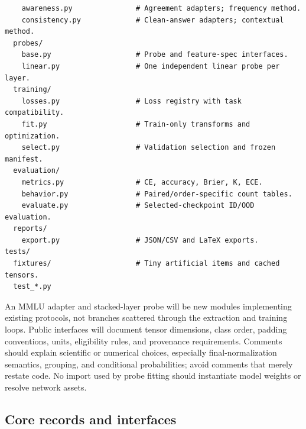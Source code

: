 \documentclass[11pt]{article}
\begin{document}
\begin{verbatim}
    awareness.py               # Agreement adapters; frequency method.
    consistency.py             # Clean-answer adapters; contextual method.
  probes/
    base.py                    # Probe and feature-spec interfaces.
    linear.py                  # One independent linear probe per layer.
  training/
    losses.py                  # Loss registry with task compatibility.
    fit.py                     # Train-only transforms and optimization.
    select.py                  # Validation selection and frozen manifest.
  evaluation/
    metrics.py                 # CE, accuracy, Brier, K, ECE.
    behavior.py                # Paired/order-specific count tables.
    evaluate.py                # Selected-checkpoint ID/OOD evaluation.
  reports/
    export.py                  # JSON/CSV and LaTeX exports.
tests/
  fixtures/                    # Tiny artificial items and cached tensors.
  test_*.py
\end{verbatim}
An MMLU adapter and stacked-layer probe will be new modules implementing existing protocols, not branches scattered through the extraction and training loops.
Public interfaces will document tensor dimensions, class order, padding conventions, units, eligibility rules, and provenance requirements.
Comments should explain scientific or numerical choices, especially final-normalization semantics, grouping, and conditional probabilities; avoid comments that merely restate code.
No import used by probe fitting should instantiate model weights or resolve network assets.

\subsection{Core records and interfaces}
\end{document}
